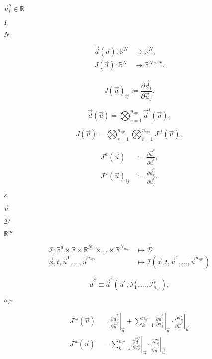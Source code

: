 \documentclass{article}
\begin{document}
$ \vec{u}^s_i \in \mathbb{R}$
\pagebreak

$ I $
\pagebreak

$ N $
\pagebreak

\begin{align*} \vec{d}(\vec{u}): \mathbb{R}^N &\mapsto \mathbb{R}^N, \\ J(\vec{u}): \mathbb{R}^N &\mapsto \mathbb{R}^{N \times N}. \end{align*}
\pagebreak

\[ J(\vec{u})_{ij} := \frac{\partial \vec{d}_i}{\partial \vec{u}_j}. \]
\pagebreak

\[ \vec{d}(\vec{u}) = \bigotimes_{s=1}^{n_{sys}} \vec{d}^s(\vec{u}), \]
\pagebreak

\[ J(\vec{u}) = \bigotimes_{s=1}^{n_{sys}} \bigotimes_{t=1}^{n_{sys}} J^{st}(\vec{u}), \]
\pagebreak

\begin{align*} J^{st}(\vec{u}) &:= \frac{\partial \vec{d}^s}{\partial \vec{u}^t},\\ J^{st}(\vec{u})_{ij} &:= \frac{\partial \vec{d}^s_i}{\partial \vec{u}^t_j}. \end{align*}
\pagebreak

$ s$
\pagebreak

$ \vec{u} $
\pagebreak

$ \mathcal{D}$
\pagebreak

$ \mathbb{R}^m$
\pagebreak

\begin{align*} \mathcal{I}: \mathbb{R}^d \times \mathbb{R} \times \mathbb{R}^{N_1} \times \dots \times \mathbb{R}^{N_{n_{sys}}} &\mapsto \mathcal{D} \\ \vec{x}, t, \vec{u}^1, \dots, \vec{u}^{n_{sys}} &\mapsto \mathcal{I}(\vec{x}, t, \vec{u}^1, \dots, \vec{u}^{n_{sys}}) \end{align*}
\pagebreak

\[ \vec{d}^s \equiv \vec{d}^s(\vec{u}^s, \mathcal{I}^s_1, \dots, \mathcal{I}^s_{n_{\mathcal{I}^s}}), \]
\pagebreak

$n_{\mathcal{I}^s}$
\pagebreak

\begin{align*} J^{ss}(\vec{u}) &= \left. \frac{\partial \vec{d}^s}{\partial \vec{u}^s} \right|_{\vec{u}} + \sum_{k=1}^{n_{\mathcal{I}^s}} \left. \frac{\partial \vec{d}^s}{\partial \mathcal{I}^s_k} \right|_{\vec{u}} \cdot \left. \frac{\partial \mathcal{I}^s_k} {\partial \vec{u}^s} \right|_{\vec{u}}\\ J^{st}(\vec{u}) &= \sum_{k=1}^{n_{\mathcal{I}^s}} \left. \frac{\partial \vec{d}^s}{\partial \mathcal{I}^s_k} \right|_{\vec{u}} \cdot \left. \frac{\partial \mathcal{I}^s_k} {\partial \vec{u}^t} \right|_{\vec{u}} \end{align*}
\pagebreak
\end{document}
